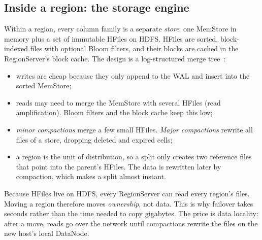 \documentclass[10pt,twocolumn,letterpaper]{article}
\begin{document}
\subsection{Inside a region: the storage engine}
Within a region, every column family is a separate \emph{store}: one MemStore in memory plus a set of immutable HFiles on HDFS. HFiles are sorted, block-indexed files with optional Bloom filters, and their blocks are cached in the RegionServer's block cache. The design is a log-structured merge tree~\cite{lsm}:
\begin{itemize}
\item writes are cheap because they only append to the WAL and insert into the sorted MemStore;
\item reads may need to merge the MemStore with several HFiles (read amplification). Bloom filters and the block cache keep this low;
\item \emph{minor compactions} merge a few small HFiles. \emph{Major compactions} rewrite all files of a store, dropping deleted and expired cells;
\item a region is the unit of distribution, so a split only creates two reference files that point into the parent's HFiles. The data is rewritten later by compaction, which makes a split almost instant.
\end{itemize}
Because HFiles live on HDFS, every RegionServer can read every region's files. Moving a region therefore moves \emph{ownership}, not data. This is why failover takes seconds rather than the time needed to copy gigabytes. The price is data locality: after a move, reads go over the network until compactions rewrite the files on the new host's local DataNode.
\end{document}
